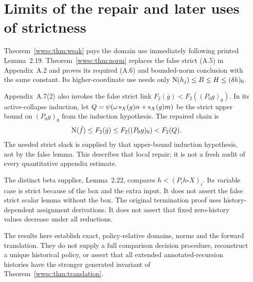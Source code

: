 \section{Limits of the repair and later uses of strictness}

Theorem~\ref{wwsc:thm:weak} pays the domain use immediately following printed
Lemma~2.19. Theorem~\ref{wwsc:thm:norm} replaces the false strict (A.5) in
Appendix~A.2 and proves its required (A.6) and bounded-norm conclusion
with the same constant. Its higher-coordinate use needs only
$\operatorname{N}(h_j)\le B\le H\le(\delta h)_0$.

Appendix~A.7(2) also invokes the false strict link
$F_2(\bar g)<F_2((P_0g)_0)$. In its active-collapse induction, let
$Q=\psi(\omega\operatorname{s}_X(g)\alpha+\operatorname{s}_X(g)m)$ be the strict upper bound
on $(P_0g)_0$ from the induction hypothesis. The repaired chain is
\[
 \operatorname{N}(\bar f)\le F_2(\bar g)
       \le F_2((P_0g)_0)<F_2(Q).
\]
The needed strict slack is supplied by that upper-bound induction
hypothesis, not by the false lemma. This describes that local repair;
it is not a fresh audit of every quantitative appendix estimate.

The distinct beta supplier, Lemma~2.22, compares
$h<(P_i h\square X)_i$. Its variable case is strict because of the
box and the extra input. It does not assert the false strict scalar
lemma without the box. The original termination proof uses
history-dependent assignment derivations. It does not assert that
fixed zero-history values decrease under all reductions.

The results here establish exact, policy-relative domains, norms and
the forward translation. They do not supply a full comparison decision
procedure, reconstruct a unique historical policy, or assert that all
extended annotated-recursion histories have the stronger generated
invariant of Theorem~\ref{wwsc:thm:translation}.


\endgroup
